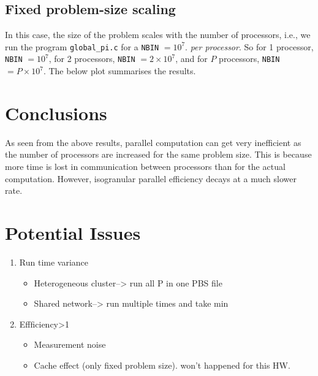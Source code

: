 \documentclass[11pt, oneside]{article}   	%
\begin{document}
\subsection{Fixed problem-size scaling}
In this case, the size of the problem scales with the number of processors, i.e., we run the program \texttt{global\_pi.c} for a \texttt{NBIN} $= 10^7$. \textit{per processor}. So for 1 processor, \texttt{NBIN} $= 10^7$, for 2 processors, \texttt{NBIN} $= 2 \times10^7$, and for $P$ processors,  \texttt{NBIN} $= P \times10^7$. The below plot summarises the results.

\vspace{-2ex} \section{Conclusions}
As seen from the above results, parallel computation can get very inefficient as the number of processors are increased for the same problem size. This is because more time is lost in communication between processors than for the actual computation. However, isogranular parallel efficiency decays at a much slower rate.
\vspace{-2ex} \section{Potential Issues}
\begin{enumerate}
	\item Run time variance
	\begin{itemize}
		\item Heterogeneous cluster--> run all P in one PBS file
		\item Shared network--> run multiple times and take min
	\end{itemize}
	\item Effficiency>1
	\begin{itemize}
	\item Measurement noise
	\item Cache effect (only fixed problem size). won't happened for this HW.
	\end{itemize}
\end{enumerate}
\end{document}
